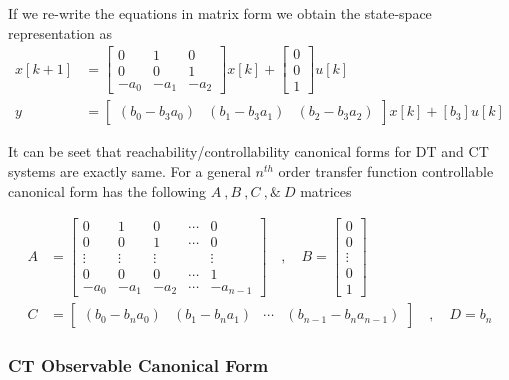 \documentclass[twoside]{article}
\begin{document}
%
If we re-write the equations in matrix form we obtain the state-space representation as
%
\begin{align*}
	x[k+1] &= \left[ \begin{array}{ccc} 0 & 1 & 0  \\  0 & 0 & 1 \\  -a_0 & -a_1 & -a_2 \end{array} \right] x[k] 
	+ \left[ \begin{array}{c} 0 \\ 0 \\ 1 \end{array} \right] u[k]
	\\
	y &= \left[ \begin{array}{ccc} ( b_0 - b_3 a_0 ) & ( b_1 - b_3 a_1 )  & ( b_2 - b_3 a_2 ) \end{array} \right] x[k]
	+ \left[ b_3 \right] u[k]
\end{align*}

It can be seet that reachability/controllability canonical forms for
DT and CT systems are exactly same.  For a general $n^{th}$ order transfer function controllable
canonical form has the following $A \ ,  B \ ,  C \ , \& \ D$
matrices

\begin{align*}
A &= \left[ \begin{array}{ccccc} 0 & 1 & 0 & \cdots & 0 \\ 0 & 0 & 1 &
                                                                      \cdots & 0
\\ \vdots & \vdots & \vdots & & \vdots
\\ 0 & 0 & 0 & \cdots & 1
    \\ -a_0 & -a_1 & -a_2 & \cdots & -a_{n-1} \end{array} \right]
\quad , \quad 
B = \left[ \begin{array}{c} 0\\ 0 \\ \vdots \\ 0
    \\ 1 \end{array} \right]
\\ C &= \left[ \begin{array}{cccc} (b_0 - b_n a_0) 
  &  (b_1 - b_n a_1) & \cdots & (b_{n-1} - b_n a_{n-1}) \end{array} \right]
\quad , \quad
D = b_n
\end{align*}

%

\subsubsection{CT Observable Canonical Form}
\end{document}
